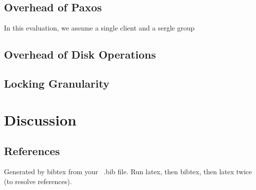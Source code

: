 \documentclass{vldb}
\begin{document}
\subsection{Overhead of Paxos}

In this evaluation, we assume a single client and a sergle group 

\subsection{Overhead of Disk Operations}

\subsection{Locking Granularity}


\section{Discussion}




\subsection{References}
Generated by bibtex from your ~.bib file.  Run latex,
then bibtex, then latex twice (to resolve references).
\end{document}
